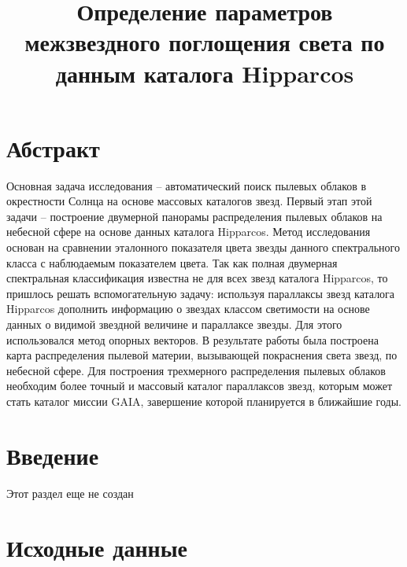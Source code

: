 \documentclass[14pt]{article}
\title{\bf Определение параметров межзвездного поглощения света по данным каталога Hipparcos}
\begin{document}
    \maketitle
    
    \section{Абстракт}
    	    Основная задача исследования – автоматический поиск пылевых облаков в окрестности Солнца на основе массовых каталогов звезд. Первый этап этой задачи – построение двумерной панорамы распределения пылевых облаков на небесной сфере на основе данных каталога Hipparcos. Метод исследования основан на сравнении эталонного показателя цвета звезды данного спектрального класса с наблюдаемым показателем цвета. Так как полная двумерная спектральная классификация известна не для всех звезд каталога Hipparcos, то пришлось решать вспомогательную задачу: используя параллаксы звезд каталога Hipparcos дополнить информацию о звездах классом светимости на основе данных о видимой звездной величине и параллаксе звезды. Для этого использовался метод опорных векторов. В результате работы была построена карта распределения пылевой материи, вызывающей покраснения света звезд, по небесной сфере. Для построения трехмерного распределения пылевых облаков необходим более точный и массовый каталог параллаксов звезд, которым может стать каталог миссии GAIA, завершение которой планируется в ближайшие годы.
    		
    	\section{Введение}
    		
    		Этот раздел еще не создан

    		
    	\section{Исходные данные}
		
\end{document}
